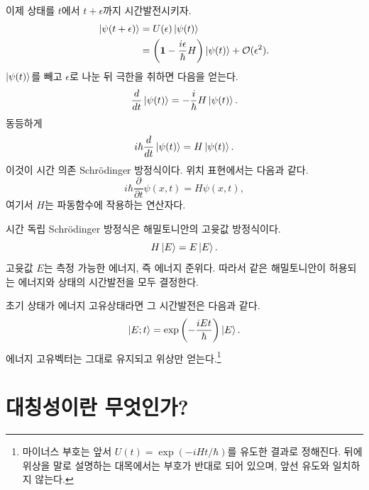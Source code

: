 이제 상태를 \(t\)에서 \(t+\epsilon\)까지 시간발전시키자.
\begin{align}
\left\lvert\psi(t+\epsilon)\right\rangle
&=
U(\epsilon)\left\lvert\psi(t)\right\rangle
\\
&=
\left(
\mathbf 1-\frac{i\epsilon}{\hbar}H
\right)\left\lvert\psi(t)\right\rangle
+\mathcal O(\epsilon^2).
\end{align}
\(\left\lvert\psi(t)\right\rangle\)를 빼고 \(\epsilon\)로 나눈 뒤 극한을 취하면 다음을 얻는다.
\begin{equation}
\frac{d}{dt}\left\lvert\psi(t)\right\rangle
=
-\frac{i}{\hbar}H\left\lvert\psi(t)\right\rangle.
\end{equation}
동등하게
\begin{equation}
i\hbar\frac{d}{dt}\left\lvert\psi(t)\right\rangle
=
H\left\lvert\psi(t)\right\rangle.
\end{equation}
이것이 시간 의존 Schr\"odinger 방정식이다. 위치 표현에서는 다음과 같다.
\begin{equation}
i\hbar\frac{\partial}{\partial t}\psi(x,t)
=
H\psi(x,t),
\end{equation}
여기서 \(H\)는 파동함수에 작용하는 연산자다.

시간 독립 Schr\"odinger 방정식은 해밀토니안의 고윳값 방정식이다.
\begin{equation}
H\left\lvert E\right\rangle=E\left\lvert E\right\rangle.
\end{equation}
고윳값 \(E\)는 측정 가능한 에너지, 즉 에너지 준위다. 따라서 같은 해밀토니안이 허용되는 에너지와 상태의 시간발전을 모두 결정한다.

초기 상태가 에너지 고유상태라면 그 시간발전은 다음과 같다.
\begin{equation}
\left\lvert E;t\right\rangle
=
\exp\left(-\frac{iEt}{\hbar}\right)\left\lvert E\right\rangle.
\end{equation}
에너지 고유벡터는 그대로 유지되고 위상만 얻는다.\footnote{마이너스 부호는 앞서 \(U(t)=\exp(-iHt/\hbar)\)를 유도한 결과로 정해진다. 뒤에 위상을 말로 설명하는 대목에서는 부호가 반대로 되어 있으며, 앞선 유도와 일치하지 않는다.}

\begin{classroomqa}
\end{classroomqa}

\section{대칭성이란 무엇인가?}

